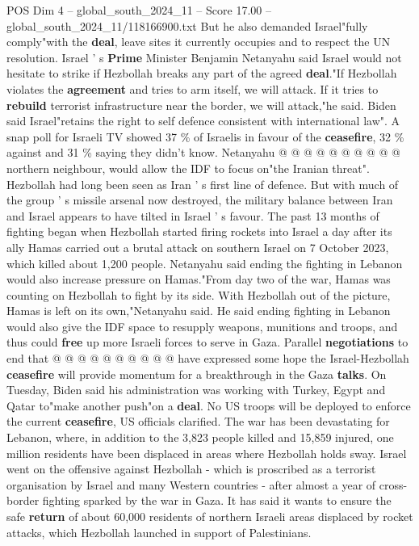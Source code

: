 \begin{textsample}{POS Dim 4 – global\_south\_2024\_11 – Score 17.00 – global\_south\_2024\_11/118166900.txt}
But he also demanded Israel"fully comply"with the \textbf{deal}, leave sites it currently occupies and to respect the UN resolution.
Israel ' s \textbf{Prime} Minister Benjamin Netanyahu said Israel would not hesitate to strike if Hezbollah breaks any part of the agreed \textbf{deal}."If Hezbollah violates the \textbf{agreement} and tries to arm itself, we will attack.
If it tries to \textbf{rebuild} terrorist infrastructure near the border, we will attack,"he said.
Biden said Israel"retains the right to self defence consistent with international law".
A snap poll for Israeli TV showed 37 \% of Israelis in favour of the \textbf{ceasefire}, 32 \% against and 31 \% saying they didn't know.
Netanyahu @ @ @ @ @ @ @ @ @ @ northern neighbour, would allow the IDF to focus on"the Iranian threat".
Hezbollah had long been seen as Iran ' s first line of defence.
But with much of the group ' s missile arsenal now destroyed, the military balance between Iran and Israel appears to have tilted in Israel ' s favour.
The past 13 months of fighting began when Hezbollah started firing rockets into Israel a day after its ally Hamas carried out a brutal attack on southern Israel on 7 October 2023, which killed about 1,200 people.
Netanyahu said ending the fighting in Lebanon would also increase pressure on Hamas."From day two of the war, Hamas was counting on Hezbollah to fight by its side.
With Hezbollah out of the picture, Hamas is left on its own,"Netanyahu said.
He said ending fighting in Lebanon would also give the IDF space to resupply weapons, munitions and troops, and thus could \textbf{free} up more Israeli forces to serve in Gaza.
Parallel \textbf{negotiations} to end that @ @ @ @ @ @ @ @ @ @ have expressed some hope the Israel-Hezbollah \textbf{ceasefire} will provide momentum for a breakthrough in the Gaza \textbf{talks}.
On Tuesday, Biden said his administration was working with Turkey, Egypt and Qatar to"make another push"on a \textbf{deal}.
No US troops will be deployed to enforce the current \textbf{ceasefire}, US officials clarified.
The war has been devastating for Lebanon, where, in addition to the 3,823 people killed and 15,859 injured, one million residents have been displaced in areas where Hezbollah holds sway.
Israel went on the offensive against Hezbollah - which is proscribed as a terrorist organisation by Israel and many Western countries - after almost a year of cross-border fighting sparked by the war in Gaza.
It has said it wants to ensure the safe \textbf{return} of about 60,000 residents of northern Israeli areas displaced by rocket attacks, which Hezbollah launched in support of Palestinians.

\end{textsample}
